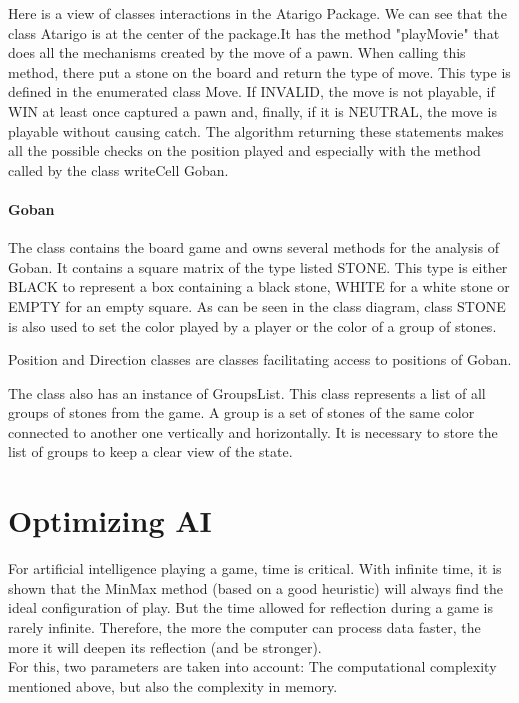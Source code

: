 \documentclass[11pt,a4paper]{report}
\begin{document}
    Here is a view of classes interactions in the Atarigo Package. We can see that the class Atarigo is at the center of the package.It has the method "playMovie" that does all the mechanisms created by the move of a pawn.
    When calling this method, there put a stone on the board and return the type of move. This type is defined in the enumerated class Move. If INVALID, the move is not playable, if WIN at least once captured a pawn and, finally, if it is NEUTRAL, the move is playable without causing catch.
The algorithm returning these statements makes all the possible checks on the position played and especially with the method called by the class writeCell Goban.

\subsubsection{Goban}


	The class contains the board game and owns several methods for the analysis of Goban. It contains a square matrix of the type listed STONE. This type is either BLACK to represent a box containing a black stone, WHITE for a white stone or EMPTY for an empty square. As can be seen in the class diagram, class STONE is also used to set the color played by a player or the color of a group of stones.

Position and Direction classes are classes facilitating access to positions of Goban.

    The class also has an instance of GroupsList. This class represents a list of all groups of stones from the game. A group is a set of stones of the same color connected to another one vertically and horizontally. It is necessary to store the list of groups to keep a clear view of the state.

\chapter*{Optimizing AI}
 

For artificial intelligence playing a game, time is critical. With infinite time, it is shown that the MinMax method (based on a good heuristic) will always find the ideal configuration of play. But the time allowed for reflection during a game is rarely infinite. Therefore, the more the computer can process data faster, the more it will deepen its reflection (and be stronger). \\

For this, two parameters are taken into account: The computational complexity mentioned above, but also the complexity in memory. \\
\end{document}
